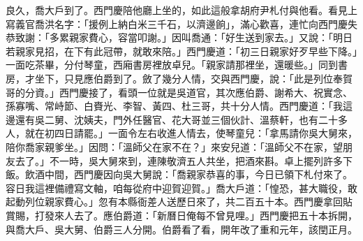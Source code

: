 良久，喬大戶到了。西門慶陪他廳上坐的，如此這般拿胡府尹札付與他看。看見上寫義官喬洪名字：「援例上納白米三千石，以濟邊餉」，滿心歡喜，連忙向西門慶失恭致謝：「多累親家費心，容當叩謝。」因叫喬通：「好生送到家去。」又說：「明日若親家見招，在下有此冠帶，就敢來陪。」西門慶道：「初三日親家好歹早些下降。」一面吃茶畢，分付琴童，西廂書房裡放卓兒。「親家請那裡坐，還暖些。」同到書房，才坐下，只見應伯爵到了。斂了幾分人情，交與西門慶，說：「此是列位奉賀哥的分資。」西門慶接了，看頭一位就是吳道官，其次應伯爵、謝希大、祝實念、孫寡嘴、常峙節、白賚光、李智、黃四、杜三哥，共十分人情。西門慶道：「我這邊還有吳二舅、沈姨夫，門外任醫官、花大哥並三個伙計、溫蔡軒，也有二十多人，就在初四日請罷。」一面令左右收進人情去，使琴童兒：「拿馬請你吳大舅來，陪你喬家親爹坐。」因問：「溫師父在家不在？」來安兒道：「溫師父不在家，望朋友去了。」不一時，吳大舅來到，連陳敬濟五人共坐，把酒來斟。卓上擺列許多下飯。飲酒中間，西門慶因向吳大舅說：「喬親家恭喜的事，今日已領下札付來了。容日我這裡備禮寫文軸，咱每從府中迎賀迎賀。」喬大戶道：「惶恐，甚大職役，敢起動列位親家費心。」忽有本縣衙差人送歷日來了，共二百五十本。西門慶拿回貼賞賜，打發來人去了。應伯爵道：「新曆日俺每不曾見哩。」西門慶把五十本拆開，與喬大戶、吳大舅、伯爵三人分開。伯爵看了看，開年改了重和元年，該閏正月。

